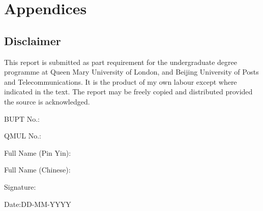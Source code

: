 \section*{Appendices}
 \vspace{-1em}
\subsection*{Disclaimer}
\raggedright \vspace{-1em}
This report is submitted as part requirement for the undergraduate degree programme at  Queen Mary University of London, and Beijing University of Posts and Telecommunications. It is the product of my own labour except where indicated in the text. The report may be  freely copied and distributed provided the source is acknowledged.

\hspace*{\fill}

BUPT No.:

QMUL No.:

Full Name (Pin Yin):

Full Name (Chinese):

\hspace*{\fill}

Signature:

\hspace*{\fill}

Date:DD-MM-YYYY

